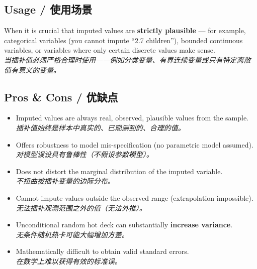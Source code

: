 \documentclass[9pt, a4paper]{article}
\begin{document}
\subsection{Usage / 使用场景}
When it is crucial that imputed values are \textbf{strictly plausible} — for example, categorical variables (you cannot impute ``2.7 children''), bounded continuous variables, or variables where only certain discrete values make sense.\\
\textit{当插补值必须严格合理时使用——例如分类变量、有界连续变量或只有特定离散值有意义的变量。}

\subsection{Pros \& Cons / 优缺点}
\begin{tcolorbox}[prosbox]
    \begin{itemize}
        \item [\ding{51}] Imputed values are always real, observed, plausible values from the sample.\\
        \textit{插补值始终是样本中真实的、已观测到的、合理的值。}
        \item [\ding{51}] Offers robustness to model mis-specification (no parametric model assumed).\\
        \textit{对模型误设具有鲁棒性（不假设参数模型）。}
        \item [\ding{51}] Does not distort the marginal distribution of the imputed variable.\\
        \textit{不扭曲被插补变量的边际分布。}
    \end{itemize}
\end{tcolorbox}
\begin{tcolorbox}[consbox]
    \begin{itemize}
        \item [\ding{55}] Cannot impute values outside the observed range (extrapolation impossible).\\
        \textit{无法插补观测范围之外的值（无法外推）。}
        \item [\ding{55}] Unconditional random hot deck can substantially \textbf{increase variance}.\\
        \textit{无条件随机热卡可能大幅增加方差。}
        \item [\ding{55}] Mathematically difficult to obtain valid standard errors.\\
        \textit{在数学上难以获得有效的标准误。}
    \end{itemize}
\end{tcolorbox}
\end{document}
